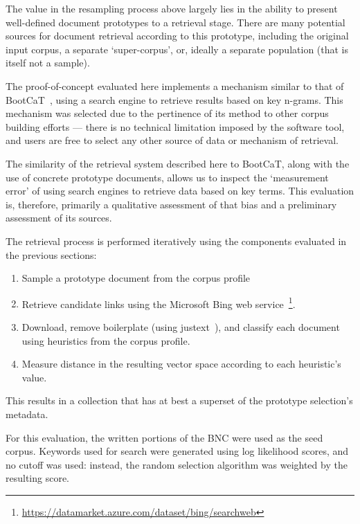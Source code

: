 The value in the resampling process above largely lies in the ability to present well-defined document prototypes to a retrieval stage.  There are many potential sources for document retrieval according to this prototype, including the original input corpus, a separate `super-corpus', or, ideally a separate population (that is itself not a sample).

The proof-of-concept evaluated here implements a mechanism similar to that of BootCaT~, using a search engine to retrieve results based on key n-grams.  This mechanism was selected due to the pertinence of its method to other corpus building efforts --- there is no technical limitation imposed by the software tool, and users are free to select any other source of data or mechanism of retrieval.

The similarity of the retrieval system described here to BootCaT, along with the use of concrete prototype documents, allows us to inspect the `measurement error' of using search engines to retrieve data based on key terms.  This evaluation is, therefore, primarily a qualitative assessment of that bias and a preliminary assessment of its sources.


The retrieval process is performed iteratively using the components evaluated in the previous sections:

\begin{enumerate}
    \item Sample a prototype document from the corpus profile
    \item Retrieve candidate links using the Microsoft Bing web service~\footnote{\url{https://datamarket.azure.com/dataset/bing/searchweb}}.
    \item Download, remove boilerplate (using justext~), and classify each document using heuristics from the corpus profile.
    \item Measure distance in the resulting vector space according to each heuristic's value.
\end{enumerate}

This results in a collection that has at best a superset of the prototype selection's metadata.

For this evaluation, the written portions of the BNC were used as the seed corpus.  Keywords used for search were generated using log likelihood scores, and no cutoff was used: instead, the random selection algorithm was weighted by the resulting score.

